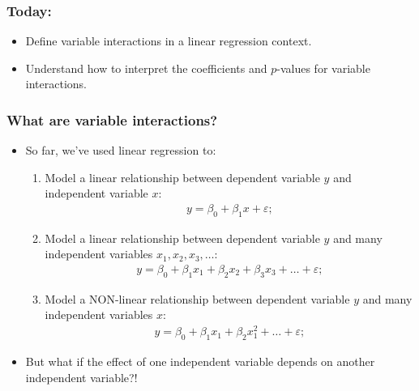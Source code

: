 \documentclass[aspectratio=169]{beamer}
\theoremstyle{principle}
\begin{document}
\begin{frame}
\frametitle{Today:}

\begin{itemize}
\item Define variable interactions in a linear regression context.
\bigskip
\bigskip
\bigskip

\item Understand how to interpret the coefficients and $p$-values for variable interactions.

\end{itemize}

\end{frame}

\begin{frame}
\frametitle{What are \textbf{variable interactions}?}

\begin{itemize}
\item So far, we've used linear regression to:
\begin{enumerate} 
\item Model a linear relationship between dependent variable $y$ and independent variable $x$:
\begin{align*}
y = \beta_0 + \beta_1x + \varepsilon;
\end{align*}
\item Model a linear relationship between dependent variable $y$ and many independent variables $x_1,x_2,x_3,\hdots$:
\begin{align*}
y = \beta_0 + \beta_1x_1 + \beta_2x_2 + \beta_3x_3 + \hdots + \varepsilon;
\end{align*}
\item Model a NON-linear relationship between dependent variable $y$ and many independent variables $x$:
\begin{align*}
y = \beta_0 + \beta_1x_1 + \beta_2x_1^2 + \hdots + \varepsilon;
\end{align*}
\end{enumerate}

\item[]\color{white} But what if the effect of one independent variable depends on another independent variable?!

\end{itemize}

\end{frame}
\end{document}
